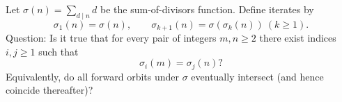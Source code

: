 Let $\sigma(n)=\sum_{d\mid n} d$ be the sum-of-divisors function. Define iterates by
\[
  \sigma_1(n)=\sigma(n),\qquad \sigma_{k+1}(n)=\sigma(\sigma_k(n))\ (k\ge 1).
\]
Question: Is it true that for every pair of integers $m,n\ge2$ there exist indices $i,j\ge1$ such that
\[
  \sigma_i(m)=\sigma_j(n)?
\]
Equivalently, do all forward orbits under $\sigma$ eventually intersect (and hence coincide thereafter)?
